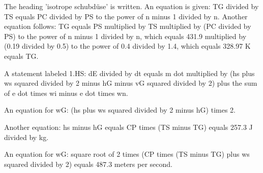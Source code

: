 The heading 'isotrope schubdüse' is written. An equation is given: TG divided by TS equals PC divided by PS to the power of n minus 1 divided by n. Another equation follows: TG equals PS multiplied by TS multiplied by (PC divided by PS) to the power of n minus 1 divided by n, which equals 431.9 multiplied by (0.19 divided by 0.5) to the power of 0.4 divided by 1.4, which equals 328.97 K equals TG. 

A statement labeled 1.HS: dE divided by dt equals m dot multiplied by (hs plus ws squared divided by 2 minus hG minus vG squared divided by 2) plus the sum of e dot times wi minus e dot times wn. 

An equation for wG: (hs plus ws squared divided by 2 minus hG) times 2. 

Another equation: hs minus hG equals CP times (TS minus TG) equals 257.3 J divided by kg. 

An equation for wG: square root of 2 times (CP times (TS minus TG) plus ws squared divided by 2) equals 487.3 meters per second.